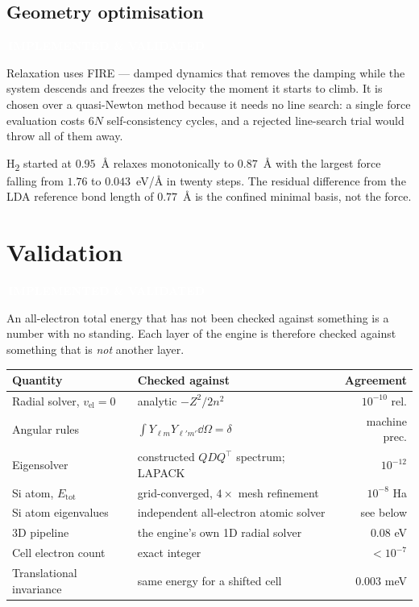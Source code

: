 \documentclass[11pt,a4paper]{article}
\newcommand{\badge}[2]{%
  \par\vspace{2pt}\noindent
  \colorbox{#1}{\textcolor{white}{\small\bfseries\,#2\,}}\par\vspace{4pt}}
\newcommand{\implemented}{\badge{okgreen}{IMPLEMENTED \& VALIDATED}}
\begin{document}
\subsection{Geometry optimisation}
\implemented

Relaxation uses FIRE --- damped dynamics that removes the damping while the
system descends and freezes the velocity the moment it starts to climb. It is
chosen over a quasi-Newton method because it needs no line search: a single
force evaluation costs $6N$ self-consistency cycles, and a rejected
line-search trial would throw all of them away.

H\textsubscript{2} started at $0.95$~\AA{} relaxes monotonically to
$0.87$~\AA{} with the largest force falling from $1.76$ to $0.043$~eV/\AA{} in
twenty steps. The residual difference from the LDA reference bond length of
$0.77$~\AA{} is the confined minimal basis, not the force.

\section{Validation}
\label{sec:validation}
\implemented

An all-electron total energy that has not been checked against something is a
number with no standing. Each layer of the engine is therefore checked against
something that is \emph{not} another layer.

\begin{center}
\small
\begin{tabular}{@{}p{}p{}r@{}}
\toprule
Quantity & Checked against & Agreement \\
\midrule
Radial solver, $v_{\text{el}} = 0$ &
  analytic $-Z^2/2n^2$ & $10^{-10}$ rel. \\
Angular rules &
  $\int Y_{\ell m}Y_{\ell'm'}\dd\Omega = \delta$ & machine prec. \\
Eigensolver &
  constructed $QDQ^{\!\top}$ spectrum; LAPACK & $10^{-12}$ \\
Si atom, $E_{\text{tot}}$ &
  grid-converged, $4\times$ mesh refinement & $10^{-8}$ Ha \\
Si atom eigenvalues &
  independent all-electron atomic solver & see below \\
3D pipeline &
  the engine's own 1D radial solver & $0.08$ eV \\
Cell electron count &
  exact integer & $< 10^{-7}$ \\
Translational invariance &
  same energy for a shifted cell & $0.003$ meV \\
\bottomrule
\end{tabular}
\end{center}
\end{document}

